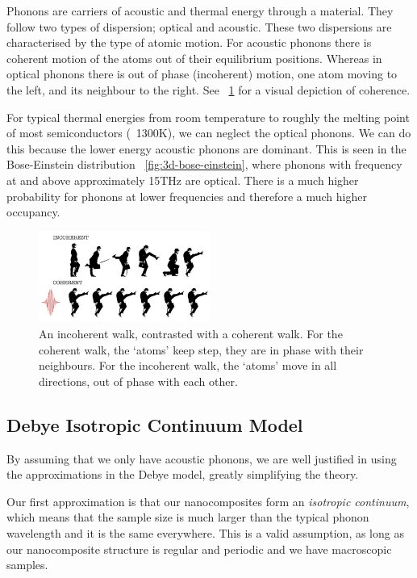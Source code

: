 \documentclass[12pt]{article}
\newcommand{\figref}[2][\figurename~]{#1\ref{#2}}
\begin{document}
Phonons are carriers of acoustic and thermal energy through a material. They follow two types of dispersion; optical and acoustic. These two dispersions are characterised by the type of atomic motion. For acoustic phonons there is coherent motion of the atoms out of their equilibrium positions. Whereas in optical phonons there is out of phase (incoherent) motion, one atom moving to the left, and its neighbour to the right. See \figref{fig:coherence-walk} for a visual depiction of coherence.

For typical thermal energies from room temperature to roughly the melting point of most semiconductors (~1300K), we can neglect the optical phonons. We can do this because the lower energy acoustic phonons are dominant. This is seen in the Bose-Einstein distribution \figref{fig:3d-bose-einstein}, where phonons with frequency at and above approximately 15THz are optical. There is a much higher probability for phonons at lower frequencies and therefore a much higher occupancy.

\begin{figure}
	\centering
	\includegraphics[width=0.5\textwidth]{coherence-walk.png}
	\caption{An incoherent walk, contrasted with a coherent walk. For the coherent walk, the `atoms' keep step, they are in phase with their neighbours. For the incoherent walk, the `atoms' move in all directions, out of phase with each other.}
	\label{fig:coherence-walk}
\end{figure}

\subsection{Debye Isotropic Continuum Model}
By assuming that we only have acoustic phonons, we are well justified in using the approximations in the Debye model, greatly simplifying the theory.

Our first approximation is that our nanocomposites form an \emph{isotropic continuum}, which means that the sample size is much larger than the typical phonon wavelength and it is the same everywhere. This is a valid assumption, as long as our nanocomposite structure is regular and periodic and we have macroscopic samples.
\end{document}
